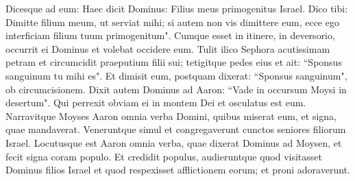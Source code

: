 \begin{biblechapter}
\verse Dicesque ad eum: Haec dicit Dominus: Filius meus primogenitus Israel.  
\verse Dico tibi: Dimitte filium meum, ut serviat mihi; si autem non vis dimittere eum, ecce ego interficiam filium tuum primogenitum". 
\verse Cumque esset in itinere, in deversorio, occurrit ei Dominus et volebat occidere eum. 
\verse Tulit ilico Sephora acutissimam petram et circumcidit praeputium filii sui; tetigitque pedes eius et ait: “Sponsus sanguinum tu mihi es". 
\verse Et dimisit eum, postquam dixerat: “Sponsus sanguinum", ob circumcisionem. 
\verse Dixit autem Dominus ad Aaron: “Vade in occursum Moysi in desertum". Qui perrexit obviam ei in montem Dei et osculatus est eum. 
\verse Narravitque Moyses Aaron omnia verba Domini, quibus miserat eum, et signa, quae mandaverat. 
\verse Veneruntque simul et congregaverunt cunctos seniores filiorum Israel. 
\verse Locutusque est Aaron omnia verba, quae dixerat Dominus ad Moysen, et fecit signa coram populo. 
\verse Et credidit populus, audieruntque quod visitasset Dominus filios Israel et quod respexisset afflictionem eorum; et proni adoraverunt. 
\end{biblechapter}


